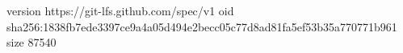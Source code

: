 version https://git-lfs.github.com/spec/v1
oid sha256:1838fb7ede3397ce9a4a05d494e2becc05c77d8ad81fa5ef53b35a770771b961
size 87540
